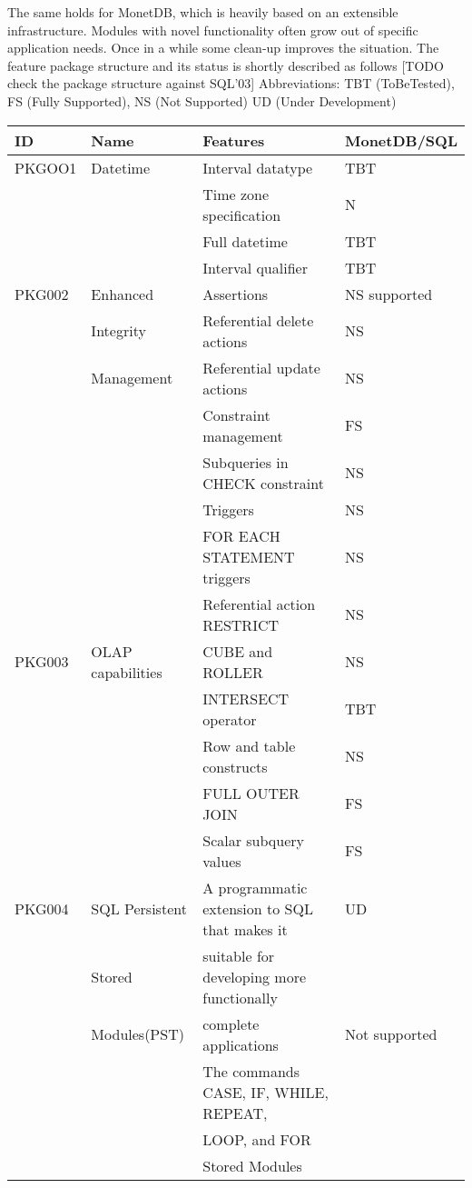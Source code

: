 \documentclass[10pt,twocolumn,fleqn]{article}
\begin{document}
The same holds for MonetDB, which is heavily based on an extensible 
infrastructure. Modules with novel functionality often grow out of
specific application needs. Once in a while some clean-up improves
the situation.
The feature package structure and its status is shortly described as follows
[TODO check the package structure against SQL'03]
Abbreviations: TBT (ToBeTested), FS  (Fully Supported), NS (Not Supported)
UD (Under Development)

\onecolumn
\begin{tabular}{l | l | l| l |}\\
ID	&Name		&Features		&MonetDB/SQL	\\\hline
PKGOO1	&Datetime	&Interval datatype		& TBT\\
	&		&Time zone specification	& N\\
	&		&Full datetime			& TBT\\
	&		&Interval qualifier 		& TBT\\\hline
PKG002	&Enhanced 	&Assertions		& NS supported\\
	&Integrity	&Referential delete actions	& NS\\
	&Management	&Referential update actions	& NS\\
	&		&Constraint management		& FS\\
	&	 	&Subqueries in CHECK constraint	& NS \\
	&	 	&Triggers			& NS\\
	&	 	&FOR EACH STATEMENT triggers	& NS\\
	&	 	&Referential action RESTRICT	& NS\\\hline
PKG003	&OLAP capabilities&CUBE and ROLLER		& NS\\
	& 		&INTERSECT operator		& TBT\\
	&	 	&Row and table constructs	& NS\\
	&		&FULL OUTER JOIN		& FS\\
	&	 	&Scalar subquery values		& FS\\\hline
PKG004	&SQL Persistent	&A programmatic extension to SQL that makes it	& UD \\
	&Stored		&suitable for developing more functionally	& \\
	&Modules(PST)	&complete applications	& Not supported\\
	&	 	&The commands CASE, IF, WHILE, REPEAT,	& \\
	&	 	&LOOP, and FOR	& \\
	&	 	&Stored Modules	& \\

\end{tabular}
\end{document}

